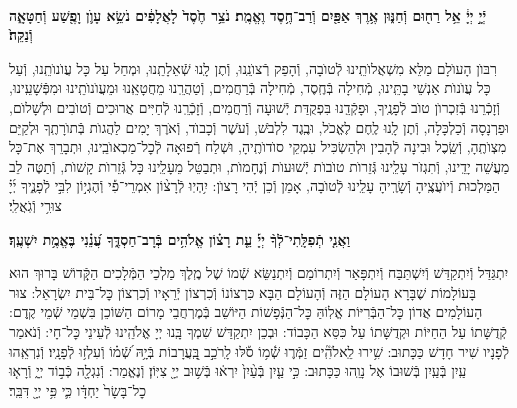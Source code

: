 \documentclass[twoside, openany, parskip=half, 11pt]{book}
\begin{document}




\pesicha

\begin{sometimes}

\\
 \textbf{יְֿיָ֣ יְיָ֔ אֵ֥ל רַח֖וּם וְֿחַנּ֑וּן אֶ֥רֶךְ אַפַּ֖יִם וְֿרַב־חֶ֥סֶד וֶאֱמֶֽת׃ נֹצֵ֥ר חֶ֙סֶד֙ לָאֲלָפִ֔ים נֹשֵׂ֥א עָוֺ֛ן וָפֶ֖שַׁע וְֿחַטָּאָ֑ה וְֿנַקֵּה֙׃}

רִבּוֺן הָעוׂלָם מַלֵּא מִשְׁאֲלוׂתֵֽינוּ לְֿטוׂבָה, וְֿהָפֵק רְֿצוׂנֵֽנוּ, וְֿתֶן לָֽנוּ שְֿׁאֵלָתֵֽנוּ, וּמְחַל עַל כָּל עֲוׂנוׂתֵֽנוּ, וְֿעַל כָּל עֲוׂנוׂת אַנְשֵׁי בָתֵּֽינוּ, מְֿחִילָה בְּֿחֶֽסֶד, מְֿחִילָה בְּֿרַחֲמִים, וְֿטַהֲרֵֽנוּ מֵחֲטָאֵֽנוּ וּמֵעֲוׂנוׂתֵֽינוּ וּמִפְּֿשָׁעֵֽינוּ, וְֿזָכְֿרֵנוּ בְּֿזִכְרוׂן טוׂב לְֿפָנֶֽיךָ, וּפָקְֿדֵֽנוּ בִּפְקֻדַּת יְֿשׁוּעָה וְֿרַחֲמִים, וְֿזָכְֿרֵֽנוּ לְֿחַיִּים אֲרוּכִים וְֿטוׂבִים וּלְשָׁלוׂם, וּפַרְנָסָה וְֿכַלְכָּלָה, וְֿתֶן לָֽנוּ לֶֽחֶם לֶאֱכׂל, וּבֶֽגֶד לִלְבּׂשׁ, וְֿעׂשֶׁר וְֿכָבוׂד, וְֿאׂרֶךְ יָמִים לַהֲגוׂת בְּֿתוׂרָתֶֽךָ וּלְקַיֵּם מִצְוׂתֶֽהָ, וְֿשֵֽׂכֶל וּבִינָה לְֿהָבִין וּלְהַשְׂכִּיל עִמְקֵי סוׂדוׂתֶֽיהָ, וּשְׁלַח רְֿפוּאָה לְֿכׇל־מַכְאוׂבֵֽינוּ, וּתְבָרֵךְ אֶת־כָּל מַעֲשֵׁה יָדֵֽינוּ, וְֿתִגְזׂר עָלֵֽינוּ גְּֿזֵרוׂת טוׂבוׂת יְֿשׁוּעוׂת וְֿנֶחָמוׂת, וּתְבַטֵּל מֵעָלֵֽינוּ כָּל גְּֿזֵרוׂת קָשׁוׂת, וְֿתַטֶּה לֵב הַמַּלְכוּת וְֿיוׂעֲצֶֽיהָ וְֿשָׂרֶֽיהָ עָלֵֽינוּ לְֿטוׂבָה, אָמֵן וְֿכֵן יְֿהִי רָצוׂן:
%
יִ֥הְיֽוּ לְֿרָצ֨וֹן אִמְרֵי־פִ֡י וְֿהֶגְי֣וֹן לִבִּ֣י לְֿפָנֶ֑יךָ יְ֜יָ֗ צוּרִ֥י וְֿגֹֽאֲלִֽי׃


\textbf{וַאֲנִ֤י תְֿפִלָּֽתִי־לְֿךָ֨ יְיָ֡ עֵ֤ת רָצ֗וֹן אֱלֹהִ֥ים בְּֿרָב־חַסְדֶּ֑ךָ עֲ֝נֵ֗נִי בֶּאֱמֶ֥ת יִשְׁעֶֽךָ׃}

\end{sometimes}

\gadlu

\label{al hakol}
יִתְגַּדַּל וְֿיִתְקַדַּשׁ וְֿיִשְׁתַּבַּח וְֿיִתְפָּאַר וְֿיִתְרוֹמַם וְֿיִתְנַשֵּׂא שְֿׁמוֹ שֶׁל מֶֽלֶךְ מַלְכֵי הַמְּֿלָכִים הַקְָּֿדוֹשׁ בָּרוּךְ הוּא בָּעוֹלָמוֹת שֶׁבָּרָא הָעוֹלָם הַזֶּה וְֿהָעוֹלָם הַבָּא כִּרְצוֹנוֹ וְֿכִרְצוֹן יְֿרֵאָיו וְֿכִרְצוֹן כׇּל־בֵּית יִשְׂרָאֵל: צוּר הָעוֹלָמִים אֲדוֹן כׇּל־הַבְּֿרִיּוֹת אֱלֽוֹהַּ כׇּל־הַנְּֿפָשׁוֹת הַיּוֹשֵׁב בְּֿמֶרְחֲבֵי מָרוֹם הַשּׁוֹכֵן בִּשְׁמֵי שְֿׁמֵי קֶֽדֶם: קְֿדֻשָּׁתוֹ עַל הַחַיּוֹת וּקְדֻשָּׁתוֹ עַל כִּסֵּא הַכָּבוֹד: וּבְכֵן יִתְקַדַּשׁ שִׁמְךָ בָּֽנוּ יְיָ אֱלֹהֵֽינוּ לְֿעֵינֵי כׇּל־חָי: וְֿנֹאמַר לְֿפָנָיו שִׁיר חָדָשׁ כַּכָּתוּב:
שִׁ֥ירוּ לֵֽאלֹהִֽ֘ים זַמְּֿר֢וּ שְֿׁ֫מ֥וֹ סֹ֡לּוּ לָֽרֹכֵ֣ב בָּֽ֭עֲרָבוֹת בְּֿיָ֥הּ שְֿׁ֝מ֗וֹ וְֿעִלְז֥וּ לְֿפָנָֽיו׃ וְֿנִרְאֵֽהוּ עַֽיִן בְּֿעַֽיִן בְּֿשׁוּבוֹ אֶל נָוֵֽהוּ כַּכָּתוּב:
%
כִּ֣י עַ֤יִן בְּֿעַ֨יִן֙ יִרְא֔וּ בְּֿשׁ֥וּב יְיָ֖ צִיּֽוֹן׃ וְֿנֶאֱמַר:
וְֿנִגְלָ֖ה כְּֿב֣וֹד יְיָ֑ וְֿרָא֤וּ כׇל־בָּשָׂר֙ יַחְדָּ֔ו כִּ֛י פִּ֥י יְיָ֖ דִּבֵּֽר׃
\end{document}
